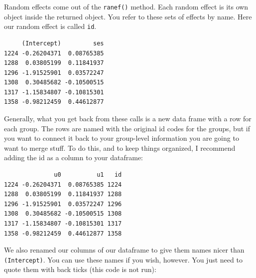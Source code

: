 \documentclass[
  letterpaper,
  DIV=11,
  numbers=noendperiod]{scrreprt}
\newenvironment{Shaded}{\begin{snugshade}}{\end{snugshade}}
\newcommand{\FunctionTok}[1]{\textcolor[rgb]{0.02,0.16,0.49}{#1}}
\newcommand{\NormalTok}[1]{\textcolor[rgb]{0.00,0.44,0.13}{#1}}
\newcommand{\OtherTok}[1]{\textcolor[rgb]{0.00,0.44,0.13}{#1}}
\newcommand{\SpecialCharTok}[1]{\textcolor[rgb]{0.25,0.44,0.63}{#1}}
\newcommand{\StringTok}[1]{\textcolor[rgb]{0.25,0.44,0.63}{#1}}
\begin{document}
Random effects come out of the \texttt{ranef()} method. Each random
effect is its own object inside the returned object. You refer to these
sets of effects by name. Here our random effect is called \texttt{id}.

\begin{Shaded}
\end{Shaded}

\begin{verbatim}
     (Intercept)         ses
1224 -0.26204371  0.08765385
1288  0.03805199  0.11841937
1296 -1.91525901  0.03572247
1308  0.30485682 -0.10500515
1317 -1.15834807 -0.10815301
1358 -0.98212459  0.44612877
\end{verbatim}

Generally, what you get back from these calls is a new data frame with a
row for each group. The rows are named with the original id codes for
the groups, but if you want to connect it back to your group-level
information you are going to want to merge stuff. To do this, and to
keep things organized, I recommend adding the id as a column to your
dataframe:

\begin{Shaded}
\end{Shaded}

\begin{verbatim}
              u0          u1   id
1224 -0.26204371  0.08765385 1224
1288  0.03805199  0.11841937 1288
1296 -1.91525901  0.03572247 1296
1308  0.30485682 -0.10500515 1308
1317 -1.15834807 -0.10815301 1317
1358 -0.98212459  0.44612877 1358
\end{verbatim}

We also renamed our columns of our dataframe to give them names nicer
than \texttt{(Intercept)}. You can use these names if you wish, however.
You just need to quote them with back ticks (this code is not run):
\end{document}
